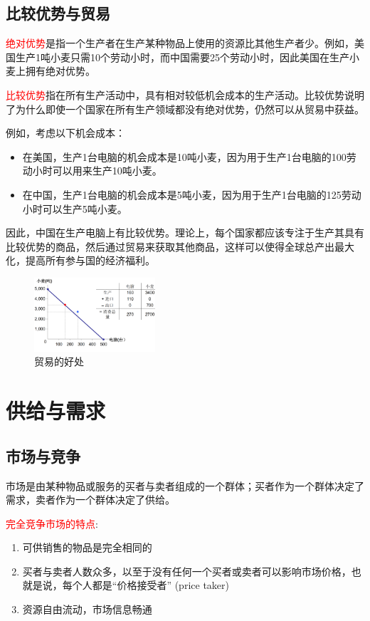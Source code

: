 \documentclass[12pt, a4paper]{article}
\begin{document}
\subsection{比较优势与贸易}
\textcolor{red}{绝对优势}是指一个生产者在生产某种物品上使用的资源比其他生产者少。例如，美国生产1吨小麦只需10个劳动小时，而中国需要25个劳动小时，因此美国在生产小麦上拥有绝对优势。

\textcolor{red}{比较优势}指在所有生产活动中，具有相对较低机会成本的生产活动。比较优势说明了为什么即使一个国家在所有生产领域都没有绝对优势，仍然可以从贸易中获益。

例如，考虑以下机会成本：
\begin{itemize}
    \item 在美国，生产1台电脑的机会成本是10吨小麦，因为用于生产1台电脑的100劳动小时可以用来生产10吨小麦。
    \item 在中国，生产1台电脑的机会成本是5吨小麦，因为用于生产1台电脑的125劳动小时可以生产5吨小麦。
\end{itemize}

因此，中国在生产电脑上有比较优势。理论上，每个国家都应该专注于生产其具有比较优势的商品，然后通过贸易来获取其他商品，这样可以使得全球总产出最大化，提高所有参与国的经济福利。

\begin{figure}[H]
  \centering
  \includegraphics[width=0.4\textwidth]{贸易的好处.png}
  \caption{贸易的好处}
\end{figure}


\newpage
\section{供给与需求}

\subsection{市场与竞争}
市场是由某种物品或服务的买者与卖者组成的一个群体；买者作为一个群体决定了需求，卖者作为一个群体决定了供给。

\textcolor{red}{完全竞争市场的特点}:
\begin{enumerate}
    \item 可供销售的物品是完全相同的
    \item 买者与卖者人数众多，以至于没有任何一个买者或卖者可以影响市场价格，也就是说，每个人都是“价格接受者” (price taker)
    \item 资源自由流动，市场信息畅通
\end{enumerate}
\end{document}
